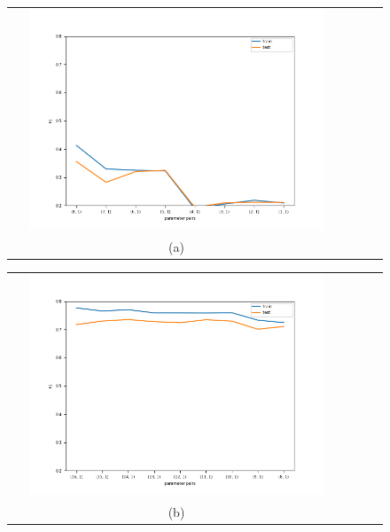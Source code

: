 \documentclass{article}
\begin{document}
\begin{figure} [H]
    \centering
    \begin{tabular}{cccc}
    \includegraphics[width=0.9\textwidth]{Results_Tree/tree-wine-not-boosted_f1.png} \\
    (a)\\[6pt]
    \end{tabular}
    \begin{tabular}{cccc}
    \includegraphics[width=0.9\textwidth]{Results_Tree/tree-covtype_balanced-not-boosted_f1.png} \\
    (b)\\[6pt]
    \end{tabular}
\end{figure}
\end{document}
